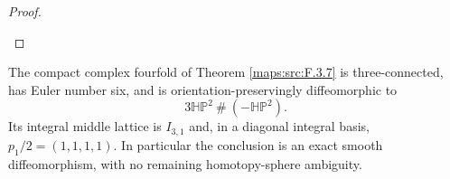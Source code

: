 \begin{proof}
\begin{enumerate}[label=\arabic*.]
\end{enumerate}
\end{proof}




\begin{theorem}\label{maps:src:F.4.1}


The compact complex fourfold of Theorem \ref{maps:src:F.3.7} is three-connected,
has Euler number six, and is orientation-preservingly diffeomorphic to
\[
 3\mathbb H\mathbb P^2\ \#\ (-\mathbb H\mathbb P^2).
 \tag{F.25}\label{maps:eq:F.25}
\]
Its integral middle lattice is $I_{3,1}$ and, in a diagonal integral
basis, $p_1/2=(1,1,1,1)$.  In particular the conclusion is an exact
smooth diffeomorphism, with no remaining homotopy-sphere ambiguity.

\end{theorem}


